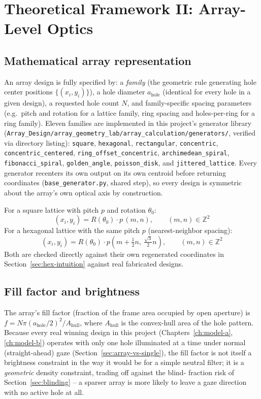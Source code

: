 \chapter{Theoretical Framework II: Array-Level Optics}
\label{ch:array-theory}

\section{Mathematical array representation}
\label{sec:array-repr}
An array design is fully specified by: a \emph{family} (the geometric rule generating
hole center positions $\{(x_i,y_i)\}$), a hole diameter $a_{\mathrm{hole}}$ (identical
for every hole in a given design), a requested hole count $N$, and family-specific
spacing parameters (e.g.\ pitch and rotation for a lattice family, ring spacing and
holes-per-ring for a ring family). Eleven families are implemented in this project's
generator library (\texttt{Array\_Design/array\_geometry\_lab/array\_calculation/generators/},
verified via directory listing): \texttt{square}, \texttt{hexagonal},
\texttt{rectangular}, \texttt{concentric}, \texttt{concentric\_centered},
\texttt{ring\_offset\_concentric}, \texttt{archimedean\_spiral},
\texttt{fibonacci\_spiral}, \texttt{golden\_angle}, \texttt{poisson\_disk}, and
\texttt{jittered\_lattice}. Every generator recenters its own output on its own
centroid before returning coordinates (\texttt{base\_generator.py}, shared step), so
every design is symmetric about the array's own optical axis by construction.

For a square lattice with pitch $p$ and rotation $\theta_0$:
\begin{equation}
(x_i,y_i) = R(\theta_0)\cdot p\,(m,n), \qquad (m,n)\in\mathbb{Z}^2
\end{equation}
For a hexagonal lattice with the same pitch $p$ (nearest-neighbor spacing):
\begin{equation}
(x_i,y_i) = R(\theta_0)\cdot p\left(m + \tfrac12 n,\ \tfrac{\sqrt3}{2}n\right),
\qquad (m,n)\in\mathbb{Z}^2
\end{equation}
Both are checked directly against their own regenerated coordinates in
Section~\ref{sec:hex-intuition} against real fabricated designs.

\section{Fill factor and brightness}
The array's fill factor (fraction of the frame area occupied by open aperture) is
$f = N\pi(a_{\mathrm{hole}}/2)^2 / A_{\mathrm{hull}}$, where $A_{\mathrm{hull}}$ is the
convex-hull area of the hole pattern. Because every real winning design in this project
(Chapters~\ref{ch:model-a}, \ref{ch:model-b}) operates with only one hole illuminated at
a time under normal (straight-ahead) gaze (Section~\ref{sec:array-vs-single}), the fill
factor is not itself a brightness constraint in the way it would be for a simple neutral
filter; it is a \emph{geometric} density constraint, trading off against the blind-
fraction risk of Section~\ref{sec:blinding} -- a sparser array is more likely to leave a
gaze direction with no active hole at all.

